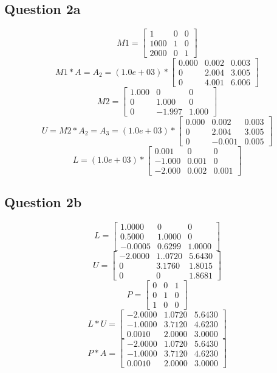 \documentclass[11pt]{article} %
\begin{document}
\subsection{Question 2a}
\[
M1=
  \begin{bmatrix}
    1 & 0 & 0  \\
    1000 & 1 & 0 \\
    2000 & 0 & 1
  \end{bmatrix}
\]
\[
M1*A = A_{2}= (1.0e+03) *
  \begin{bmatrix}
    0.000 & 0.002 & 0.003  \\
    0 & 2.004 & 3.005 \\
    0 & 4.001 & 6.006
  \end{bmatrix}
\]
\[
M2=
  \begin{bmatrix}
    1.000 & 0 & 0  \\
    0 & 1.000 & 0 \\
    0 & -1.997 & 1.000
  \end{bmatrix}
\]
\[
U = M2*A_{2} = A_{3}= (1.0e+03) *
  \begin{bmatrix}
    0.000 & 0.002 & 0.003  \\
    0 & 2.004 & 3.005 \\
    0 & -0.001 & 0.005
  \end{bmatrix}
\]
\[
L = (1.0e+03) *
  \begin{bmatrix}
    0.001 & 0 & 0  \\
    -1.000 & 0.001 & 0 \\
    -2.000 & 0.002 & 0.001
  \end{bmatrix}
\]
\subsection{Question 2b}
\[
L=
  \begin{bmatrix}
    1.0000 & 0 & 0  \\
    0.5000 &1.0000 & 0\\
    -0.0005 & 0.6299 & 1.0000
  \end{bmatrix}
\]
\[
U=
  \begin{bmatrix}
    -2.0000 & 1..0720 & 5.6430  \\
    0 & 3.1760 & 1.8015\\
    0 & 0 & 1.8681
  \end{bmatrix}
\]
\[
P=
  \begin{bmatrix}
    0& 0 & 1  \\
    0 & 1 & 0\\
    1 & 0 & 0
  \end{bmatrix}
\]
\[
L*U  =
  \begin{bmatrix}
    -2.0000 & 1.0720 & 5.6430  \\
     -1.0000 & 3.7120 & 4.6230\\
    0.0010 & 2.0000 & 3.0000
  \end{bmatrix}
\]
\[
P*A  =
  \begin{bmatrix}
    -2.0000 & 1.0720 & 5.6430  \\
     -1.0000 & 3.7120 & 4.6230\\
    0.0010 & 2.0000 & 3.0000
  \end{bmatrix}
\]
\end{document}
